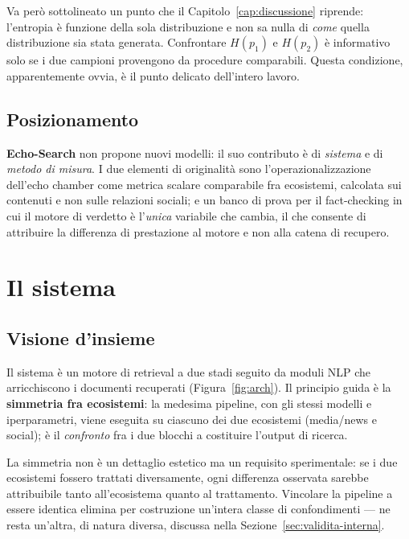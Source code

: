 \documentclass[11pt,a4paper]{report}
\newcommand{\ES}{\textbf{Echo-Search}}
\begin{document}
Va però sottolineato un punto che il Capitolo~\ref{cap:discussione} riprende: l'entropia è
funzione della sola distribuzione e non sa nulla di \emph{come} quella distribuzione sia stata
generata. Confrontare $H(p_1)$ e $H(p_2)$ è informativo solo se i due campioni provengono da
procedure comparabili. Questa condizione, apparentemente ovvia, è il punto delicato dell'intero
lavoro.

\section{Posizionamento}
\ES{} non propone nuovi modelli: il suo contributo è di \emph{sistema} e di \emph{metodo di
misura}. I due elementi di originalità sono l'operazionalizzazione dell'echo chamber come
metrica scalare comparabile fra ecosistemi, calcolata sui contenuti e non sulle relazioni
sociali; e un banco di prova per il fact-checking in cui il motore di verdetto è l'\emph{unica}
variabile che cambia, il che consente di attribuire la differenza di prestazione al motore e
non alla catena di recupero.

\chapter{Il sistema}\label{cap:sistema}

\section{Visione d'insieme}
Il sistema è un motore di retrieval a due stadi seguito da moduli NLP che arricchiscono i
documenti recuperati (Figura~\ref{fig:arch}). Il principio guida è la \textbf{simmetria fra
ecosistemi}: la medesima pipeline, con gli stessi modelli e iperparametri, viene eseguita su
ciascuno dei due ecosistemi (media/news e social); è il \emph{confronto} fra i due blocchi a
costituire l'output di ricerca.

La simmetria non è un dettaglio estetico ma un requisito sperimentale: se i due ecosistemi
fossero trattati diversamente, ogni differenza osservata sarebbe attribuibile tanto
all'ecosistema quanto al trattamento. Vincolare la pipeline a essere identica elimina per
costruzione un'intera classe di confondimenti --- ne resta un'altra, di natura diversa,
discussa nella Sezione~\ref{sec:validita-interna}.
\end{document}
